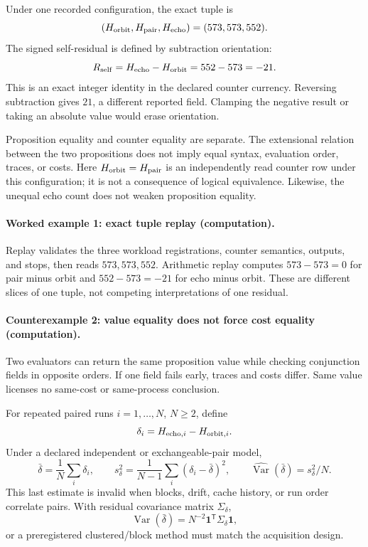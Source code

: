 Under one recorded configuration, the exact tuple is
\[
                         (H_{\rm orbit},H_{\rm pair},H_{\rm echo})
                         =(573,573,552).
\]
The signed self-residual is defined by subtraction orientation:
\[
                         R_{\rm self}=H_{\rm echo}-H_{\rm orbit}=552-573=-21.
\]
This is an exact integer identity in the declared counter currency.  Reversing subtraction gives \(21\), a different
reported field.  Clamping the negative result or taking an absolute value would erase orientation.

Proposition equality and counter equality are separate.  The extensional relation between the two propositions does
not imply equal syntax, evaluation order, traces, or costs.  Here \(H_{\rm orbit}=H_{\rm pair}\) is an independently
read counter row under this configuration; it is not a consequence of logical equivalence.  Likewise, the unequal
echo count does not weaken proposition equality.

\paragraph{Worked example 1: exact tuple replay (computation).}
Replay validates the three workload registrations, counter semantics, outputs, and stops, then reads \(573,573,552\).
Arithmetic replay computes \(573-573=0\) for pair minus orbit and \(552-573=-21\) for echo minus orbit.  These are
different slices of one tuple, not competing interpretations of one residual.

\paragraph{Counterexample 2: value equality does not force cost equality (computation).}
Two evaluators can return the same proposition value while checking conjunction fields in opposite orders.  If one
field fails early, traces and costs differ.  Same value licenses no same-cost or same-process conclusion.

For repeated paired runs \(i=1,\ldots,N\), \(N\geq2\), define
\[
                         \delta_i=H_{{\rm echo},i}-H_{{\rm orbit},i}.
\]
Under a declared independent or exchangeable-pair model,
\[
\bar\delta=\frac1N\sum_i\delta_i,\qquad
s_\delta^2=\frac1{N-1}\sum_i(\delta_i-\bar\delta)^2,\qquad
\widehat{\operatorname{Var}}(\bar\delta)=s_\delta^2/N.
\]
This last estimate is invalid when blocks, drift, cache history, or run order correlate pairs.  With residual
covariance matrix \(\Sigma_\delta\),
\[
                         \operatorname{Var}(\bar\delta)
=N^{-2}\mathbf1^{\mathsf T}\Sigma_\delta\mathbf1,
\]
or a preregistered clustered/block method must match the acquisition design.

